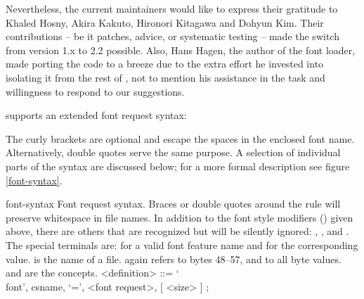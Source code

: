 Nevertheless, the current maintainers would like to express their
gratitude to Khaled Hosny, Akira Kakuto, Hironori Kitagawa and Dohyun
Kim.
%
Their contributions -- be it patches, advice, or systematic
testing -- made the switch from version 1.x to 2.2 possible.
%
Also, Hans Hagen, the author of the font loader, made porting the
code to \LATEX a breeze due to the extra effort he invested into
isolating it from the rest of \CONTEXT, not to mention his assistance
in the task and willingness to respond to our suggestions.

\endsection


 supports an extended font request syntax:

\beginnarrower
\endnarrower

\noindent
The curly brackets are optional and escape the spaces in the enclosed
font name.
%
Alternatively, double quotes serve the same purpose.
%
A selection of individual parts of the syntax are discussed below;
for a more formal description see figure \ref{font-syntax}.

\beginsyntaxfloat
  {font-syntax}
  {Font request syntax.
   Braces or double quotes around the
    rule will
   preserve whitespace in file names.
   In addition to the font style modifiers
   () given above, there
   are others that are recognized but will be silently
   ignored: ,
            , and
            .
   The special terminals are:
    for a valid font
      feature name and
    for the corresponding
      value.
    is the name of a  file.
     again refers to bytes 48--57, and
    to all byte values.
    and  are the \TEX concepts.}
%
      <definition>      ::= `\\font', {\sc csname}, `=', <font request>, [ <size> ] ;

